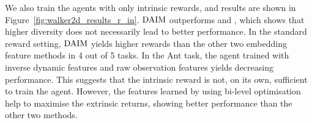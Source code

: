 We also train the agents with only intrinsic rewards, and results are shown in Figure~\ref{fig:walker2d_results_r_in}. $\text{DAIM}$ outperforms  and , which shows that higher diversity does not necessarily lead to better performance. In the standard reward setting, $\text{DAIM}$ yields higher rewards than the other two embedding feature methods in 4 out of 5 tasks. In the Ant task, the agent trained with inverse dynamic features and raw observation features yields decreasing performance. This suggests that the intrinsic reward is not, on its own, sufficient to train the agent. However, the features learned by using bi-level optimisation help to maximise the extrinsic returns, showing better performance than the other two methods.


